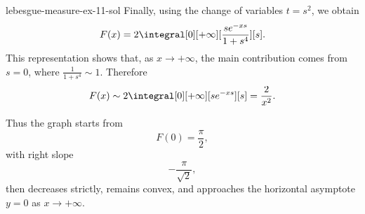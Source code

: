 \documentclass[preview]{standalone}
\begin{document}
\begin{snippetsolution}{lebesgue-measure-ex-11-sol}{}
    Finally, using the change of variables \(t=s^2\), we obtain
    \[
        F(x)
        =
        2\integral[0][+\infty][
            \frac{s e^{-xs}}{1+s^4}
        ][s].
    \]
    This representation shows that, as \(x\to+\infty\), the main contribution
    comes from \(s=0\), where \(\frac{1}{1+s^4}\sim 1\). Therefore
    \[
        F(x)\sim 2\integral[0][+\infty][s e^{-xs}][s]
        =
        \frac{2}{x^2}.
    \]

    Thus the graph starts from
    \[
        F(0)=\frac\pi2,
    \]
    with right slope
    \[
        -\frac{\pi}{\sqrt2},
    \]
    then decreases strictly, remains convex, and approaches the horizontal
    asymptote \(y=0\) as \(x\to+\infty\).
\end{snippetsolution}
\end{document}
